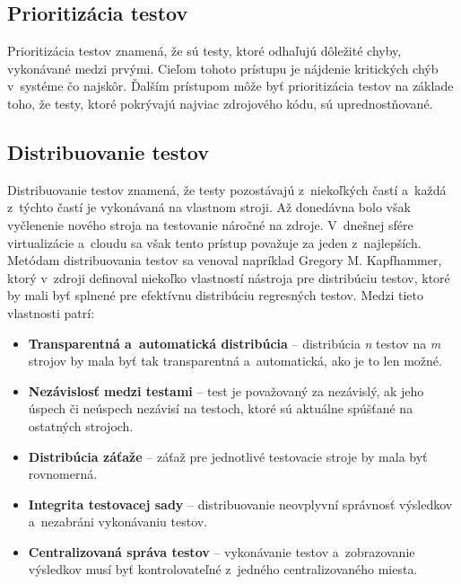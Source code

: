 \subsection*{Prioritizácia testov}
Prioritizácia testov znamená, že sú testy, ktoré odhaľujú dôležité chyby, vykonávané medzi prvými.
Cieľom tohoto prístupu je nájdenie kritických chýb v~systéme čo najskôr. 
Ďalším prístupom môže byť prioritizácia testov na základe toho, že testy, ktoré pokrývajú najviac zdrojového kódu,
sú uprednostňované.

\subsection*{Distribuovanie testov}
Distribuovanie testov znamená, že testy pozostávajú z~niekoľkých častí a~každá z~týchto častí je vykonávaná na vlastnom stroji.
Až donedávna bolo však vyčlenenie nového stroja na testovanie náročné na zdroje.
V~dnešnej sfére virtualizácie a~cloudu sa však tento prístup považuje za jeden z~najlepších.
Metódam distribuovania testov sa venoval napríklad Gregory M. Kapfhammer, ktorý v~zdroji \cite{Kapfhammer} definoval niekoľko
vlastností nástroja pre distribúciu testov, ktoré by mali byť splnené pre efektívnu distribúciu regresných testov.
Medzi tieto vlastnosti patrí:
\begin{itemize}
\item \textbf{Transparentná a~automatická distribúcia} -- distribúcia \emph{n} testov na \emph{m} strojov by mala byť tak transparentná a~automatická,
ako je to len možné.
\item \textbf{Nezávislosť medzi testami} -- test je považovaný za nezávislý, ak jeho úspech či neúspech nezávisí na testoch, ktoré
sú aktuálne spúšťané na ostatných strojoch. 
\item \textbf{Distribúcia záťaže} -- záťaž pre jednotlivé testovacie stroje by mala byť rovnomerná.
\item \textbf{Integrita testovacej sady} -- distribuovanie neovplyvní správnosť výsledkov a~nezabráni vykonávaniu testov.
\item \textbf{Centralizovaná správa testov} -- vykonávanie testov a~zobrazovanie výsledkov musí byť kontrolovateľné z~jedného centralizovaného miesta.
\end{itemize}




